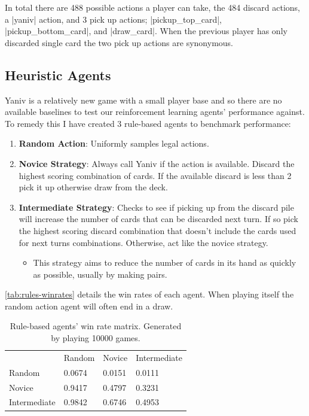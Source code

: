 \documentclass[../main.tex]{subfiles}
\begin{document}
In total there are 488 possible actions a player can take, the 484 discard actions, a |yaniv| action, and 3 pick up actions; |pickup_top_card|, |pickup_bottom_card|, and |draw_card|. When the previous player has only 
discarded single card the two pick up actions are synonymous. 


\subsection{Heuristic Agents} \label{method:rule_agents}

Yaniv is a relatively new game with a small player base and so there are no available baselines to test our reinforcement learning agents' performance against. To remedy this I have created 3 rule-based agents to benchmark performance:

\begin{enumerate}
    \item \textbf{Random Action}: Uniformly samples legal actions.
    \item \textbf{Novice Strategy}: Always call Yaniv if the action is available. Discard the highest scoring combination of cards. If the available discard is less than 2 pick it up otherwise draw from the deck. 
    \item \textbf{Intermediate Strategy}: Checks to see if picking up from the discard pile will increase the number of cards that can be discarded next turn. If so pick the highest scoring discard combination that doesn't include the cards used for next turns combinations. Otherwise, act like the novice strategy. 
    \begin{itemize}
        \item This strategy aims to reduce the number of cards in its hand as quickly as possible, usually by making pairs. 
    \end{itemize}
\end{enumerate}

\autoref{tab:rules-winrates} details the win rates of each agent. When playing itself the random action agent will often end in a draw. 

\begin{table}[]
\centering
\begin{tabular}{@{}llll@{}}
             & Random & Novice & Intermediate \\
Random       & 0.0674 & 0.0151 & 0.0111       \\
Novice       & 0.9417 & 0.4797 & 0.3231       \\
Intermediate & 0.9842 & 0.6746 & 0.4953      
\end{tabular}
\caption{Rule-based agents' win rate matrix. Generated by playing 10000 games.}
\label{tab:rules-winrates}
\end{table}
\end{document}
